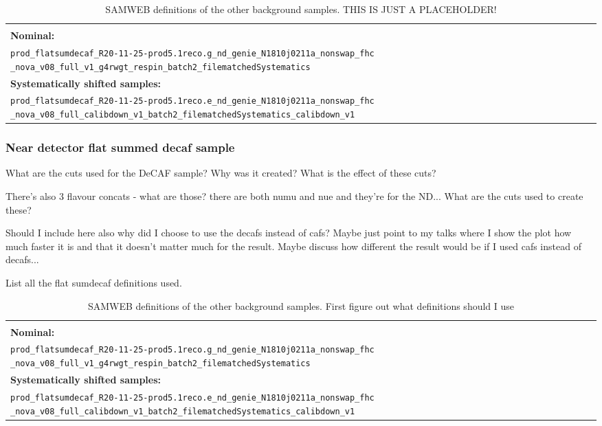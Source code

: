 \documentclass[12pt]{article}
\begin{document}
\begin{table}[!ht]
\centering
\begin{tabular}{p{\textwidth}}
\hline\hline\\
\textbf{Nominal:}\\
\texttt{prod\_flatsumdecaf\_R20-11-25-prod5.1reco.g\_nd\_genie\_N1810j0211a\_nonswap\_fhc} \texttt{\_nova\_v08\_full\_v1\_g4rwgt\_respin\_batch2\_filematchedSystematics}\\[2mm]
\textbf{Systematically shifted samples:}\\
\texttt{prod\_flatsumdecaf\_R20-11-25-prod5.1reco.e\_nd\_genie\_N1810j0211a\_nonswap\_fhc} \texttt{\_nova\_v08\_full\_calibdown\_v1\_batch2\_filematchedSystematics\_calibdown\_v1}\\[2mm]
\hline\hline
\end{tabular}
\caption{SAMWEB definitions of the other background samples. THIS IS JUST A PLACEHOLDER!}
\label{tab:NueCCMECDefinitions}
\end{table}

\subsubsection*{Near detector flat summed decaf sample}
What are the cuts used for the DeCAF sample? Why was it created? What is the effect of these cuts?

There's also 3 flavour concats - what are those? there are both numu and nue and they're for the ND... What are the cuts used to create these?

Should I include here also why did I choose to use the decafs instead of cafs? Maybe just point to my talks where I show the plot how much faster it is and that it doesn't matter much for the result. Maybe discuss how different the result would be if I used cafs instead of decafs...

List all the flat sumdecaf definitions used.
\begin{table}[!ht]
\centering
\begin{tabular}{p{\textwidth}}
\hline\hline\\
\textbf{Nominal:}\\
\texttt{prod\_flatsumdecaf\_R20-11-25-prod5.1reco.g\_nd\_genie\_N1810j0211a\_nonswap\_fhc} \texttt{\_nova\_v08\_full\_v1\_g4rwgt\_respin\_batch2\_filematchedSystematics}\\[2mm]
\textbf{Systematically shifted samples:}\\
\texttt{prod\_flatsumdecaf\_R20-11-25-prod5.1reco.e\_nd\_genie\_N1810j0211a\_nonswap\_fhc} \texttt{\_nova\_v08\_full\_calibdown\_v1\_batch2\_filematchedSystematics\_calibdown\_v1}\\[2mm]
\hline\hline
\end{tabular}
\caption{SAMWEB definitions of the other background samples. First figure out what definitions should I use}
\label{tab:SumDeCAFDefinitions}
\end{table}
\end{document}
